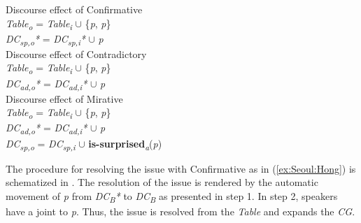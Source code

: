 \documentclass[output=paper,colorlinks,citecolor=brown]{langscibook}
\begin{document}
\ea \label{ex:deird:Hong}
    \ea \label{ex:deirda:Hong} Discourse effect of Confirmative \\
        \ea \textit{Table\textsubscript{o}} = \textit{Table\textsubscript{i}} $\cup$ \{\textit{p}, \textit{\neg p}\}\\
        \ex \textit{DC\textsubscript{sp,o}*} = \textit{DC\textsubscript{sp,i}*} $\cup$ \textit{p}\\
        \z
    \ex \label{ex:deirdb:Hong} Discourse effect of Contradictory \\
        \ea \textit{Table\textsubscript{o}} = \textit{Table\textsubscript{i}} $\cup$ \{\textit{p}, \textit{\neg p}\}\\
        \ex \textit{DC\textsubscript{ad,o}*} = \textit{DC\textsubscript{ad,i}*} $\cup$ \textit{p}\\
        \z
    \ex \label{ex:deirdc:Hong} Discourse effect of Mirative \\
        \ea \textit{Table\textsubscript{o}} = \textit{Table\textsubscript{i}} $\cup$ \{\textit{p}, \textit{\neg p}\}\\
        \ex \textit{DC\textsubscript{ad,o}*} = \textit{DC\textsubscript{ad,i}*} $\cup$ \textit{p}\\
        \ex \textit{DC\textsubscript{sp,o}} = \textit{DC\textsubscript{sp,i}} $\cup$ \textbf{is-surprised}\textit{\textsubscript{a}}(\textit{p})\\
        \z
    \z
\z

The procedure for resolving the issue with Confirmative  as in (\ref{ex:Seoul:Hong}) is schematized in . The resolution of the issue is rendered by the automatic movement of \textit{p} from \textit{DC\textsubscript{B}*} to  \textit{DC\textsubscript{B}} as presented in step 1. In step 2, speakers have a joint  to \textit{p}. Thus, the issue is resolved from the \textit{Table} and expands the \textit{CG}.
\end{document}
